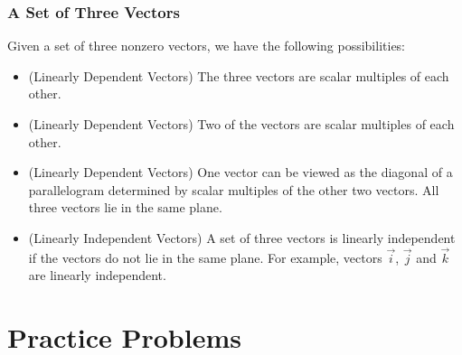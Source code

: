 \documentclass{ximera}
\begin{document}
\subsubsection*{A Set of Three Vectors}
Given a set of three nonzero vectors, we have the following possibilities: 
\begin{itemize}
\item (Linearly Dependent Vectors)
The three vectors are scalar multiples of each other.
\begin{center}
\end{center}
\item (Linearly Dependent Vectors) Two of the vectors are scalar multiples of each other.
\begin{center}
\end{center}
\item (Linearly Dependent Vectors) One vector can be viewed as the diagonal of a parallelogram determined by scalar multiples of the other two vectors.  All three vectors lie in the same plane.
\begin{center}
\end{center}
\item (Linearly Independent Vectors)
A set of three vectors is linearly independent if the vectors do not lie in the same plane.  For example, vectors $\vec{i}$, $\vec{j}$ and $\vec{k}$ are linearly independent.
\end{itemize}

\section*{Practice Problems}
\end{document}
